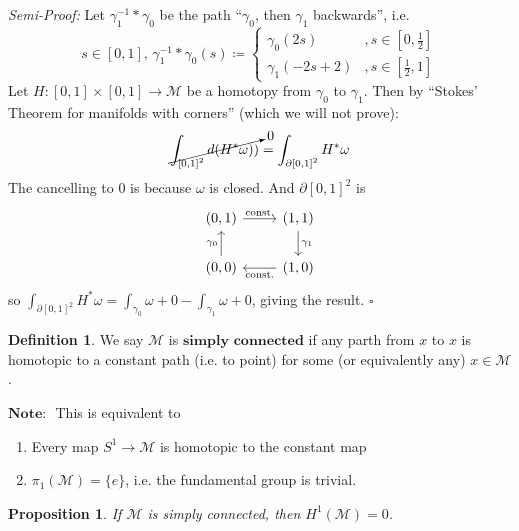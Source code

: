 \documentclass[10pt]{article}
\theoremstyle{plain}
\newtheorem{prop}[thm]{Proposition}
\theoremstyle{definition}
\newtheorem{defn}[thm]{Definition} %
\newenvironment{semiproof}{\textit{Semi-Proof:}}{\hfill$\square$}
\newcommand{\Note}{\textbf{Note: }}
\newcommand{\man}{\mathcal{M}}
\newcommand{\xman}{x\in\man}
\newcommand{\deriv}{d}
\newcommand{\cohomman}[1]{H^{#1}(\man)}
\newcommand{\inter}{\left[0,1\right]}
\begin{document}
\begin{semiproof}
Let $\gamma_1^{-1}* \gamma_0$ be the path ``$\gamma_0$, then $\gamma_1$ backwards'', i.e.
$$s\in\inter, \, \gamma_1^{-1}* \gamma_0(s) \coloneqq \begin{cases} \gamma_0(2s) &,s\in\left[0,\frac{1}{2}\right] \\ \gamma_1(-2s+2) &,s\in \left[\frac{1}{2},1\right]\end{cases}$$
Let $H:\inter\times\inter \to \man$ be a homotopy from $\gamma_0$ to $\gamma_1$. Then by ``Stokes' Theorem for manifolds with corners'' (which we will not prove):
$$\cancelto{0}{\int_{\inter^2} \deriv(H^*\omega))} = \int_{\partial \inter^2} H^*\omega$$
The cancelling to 0 is because $\omega$ is closed.
And $\partial \inter^2$ is $$\begin{tikzcd}
{(0,1)} \arrow[r, "\text{const.}"] & {(1,1)} \arrow[d, "\gamma_1"]      \\
{(0,0)} \arrow[u, "\gamma_0"]      & {(1,0)} \arrow[l, "\text{const.}"]
\end{tikzcd}$$ so $\int_{\partial\inter^2} H^*\omega = \int_{\gamma_0}\omega + 0 - \int_{\gamma_1} \omega +0$, giving the result.
\end{semiproof}
\begin{defn}
We say $\man$ is $\textbf{simply connected}$ if any parth from $x$ to $x$ is homotopic to a constant path (i.e. to point) for some (or equivalently any) $\xman$.
\end{defn}
$\Note$ This is equivalent to \begin{enumerate}
    \item Every map $S^1 \to \man$ is homotopic to the constant map
    \item $\pi_1(\man) = \{e\}$, i.e. the fundamental group is trivial.
\end{enumerate}
\begin{prop}
If $\man$ is simply connected, then $\cohomman{1} = 0$.
\end{prop}
\end{document}
